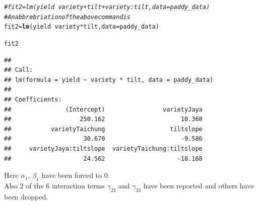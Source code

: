\documentclass[11pt, a4paper]{article}\usepackage[]{graphicx}\usepackage[dvipsnames]{xcolor}
\makeatletter
\newcommand{\hlcom}[1]{\textcolor[rgb]{0.678,0.584,0.686}{\textit{#1}}}%
\newcommand{\hlopt}[1]{\textcolor[rgb]{0,0,0}{#1}}%
\newcommand{\hlstd}[1]{\textcolor[rgb]{0.345,0.345,0.345}{#1}}%
\newcommand{\hlkwb}[1]{\textcolor[rgb]{0.69,0.353,0.396}{#1}}%
\newcommand{\hlkwc}[1]{\textcolor[rgb]{0.333,0.667,0.333}{#1}}%
\newcommand{\hlkwd}[1]{\textcolor[rgb]{0.737,0.353,0.396}{\textbf{#1}}}%
\newenvironment{kframe}{%
 \def\at@end@of@kframe{}%
 \ifinner\ifhmode%
  \def\at@end@of@kframe{\end{minipage}}%
  \begin{minipage}{\columnwidth}%
 \fi\fi%
 \def\FrameCommand##1{\hskip\@totalleftmargin \hskip-\fboxsep
 \colorbox{shadecolor}{##1}\hskip-\fboxsep
     \hskip-\linewidth \hskip-\@totalleftmargin \hskip\columnwidth}%
 \MakeFramed {\advance\hsize-\width
   \@totalleftmargin\z@ \linewidth\hsize
   \@setminipage}}%
 {\par\unskip\endMakeFramed%
 \at@end@of@kframe}
\newenvironment{knitrout}{}{} %
\makeatother
\begin{document}
\begin{knitrout}
\color{fgcolor}\begin{kframe}
\begin{alltt}
\hlcom{# fit2 = lm(yield ~ variety + tilt + variety:tilt, data = paddy_data)}
\hlcom{# An abbrebriation of the above command is}
\hlstd{fit2} \hlkwb{=} \hlkwd{lm}\hlstd{(yield} \hlopt{~} \hlstd{variety}\hlopt{*}\hlstd{tilt,} \hlkwc{data} \hlstd{= paddy_data)}
\end{alltt}
\end{kframe}
\end{knitrout}

\begin{knitrout}
\color{fgcolor}\begin{kframe}
\begin{alltt}
\hlstd{fit2}
\end{alltt}
\begin{verbatim}
## 
## Call:
## lm(formula = yield ~ variety * tilt, data = paddy_data)
## 
## Coefficients:
##               (Intercept)                varietyJaya  
##                   250.162                     10.368  
##           varietyTaichung                  tiltslope  
##                    30.670                     -9.586  
##     varietyJaya:tiltslope  varietyTaichung:tiltslope  
##                    24.562                    -18.168
\end{verbatim}
\end{kframe}
\end{knitrout}

Here $\alpha_1$, $\beta_1$ have been forced to 0. \\

Also 2 of the 6 interaction terms $\gamma_{22}$ and $\gamma_{32}$ have been reported and others have been dropped.
\end{document}
